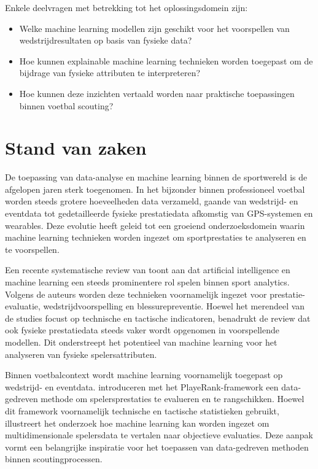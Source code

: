 Enkele deelvragen met betrekking tot het oplossingsdomein zijn: 
\begin{itemize}
    \item Welke machine learning modellen zijn geschikt voor het voorspellen van wedstrijdresultaten op basis van fysieke data?
    \item Hoe kunnen explainable machine learning technieken worden toegepast om de bijdrage van fysieke attributen te interpreteren?
    \item Hoe kunnen deze inzichten vertaald worden naar praktische toepassingen binnen voetbal scouting?
\end{itemize}


\section{Stand van zaken}%
\label{sec:literatuurstudie}

De toepassing van data-analyse en machine learning binnen de sportwereld is de afgelopen jaren sterk toegenomen. In het bijzonder binnen professioneel voetbal worden steeds grotere hoeveelheden data verzameld, gaande van wedstrijd- en eventdata tot gedetailleerde fysieke prestatiedata afkomstig van GPS-systemen en wearables. Deze evolutie heeft geleid tot een groeiend onderzoeksdomein waarin machine learning technieken worden ingezet om sportprestaties te analyseren en te voorspellen.

Een recente systematische review van \textcite{Pietraszewski2025_AI_SportsAnalytics} toont aan dat artificial intelligence en machine learning een steeds prominentere rol spelen binnen sport analytics. Volgens de auteurs worden deze technieken voornamelijk ingezet voor prestatie-evaluatie, wedstrijdvoorspelling en blessurepreventie. Hoewel het merendeel van de studies focust op technische en tactische indicatoren, benadrukt de review dat ook fysieke prestatiedata steeds vaker wordt opgenomen in voorspellende modellen. Dit onderstreept het potentieel van machine learning voor het analyseren van fysieke spelersattributen.

Binnen voetbalcontext wordt machine learning voornamelijk toegepast op wedstrijd- en eventdata. \textcite{Pappalardo2018_PlayeRank} introduceren met het PlayeRank-framework een data-gedreven methode om spelersprestaties te evalueren en te rangschikken. Hoewel dit framework voornamelijk technische en tactische statistieken gebruikt, illustreert het onderzoek hoe machine learning kan worden ingezet om multidimensionale spelersdata te vertalen naar objectieve evaluaties. Deze aanpak vormt een belangrijke inspiratie voor het toepassen van data-gedreven methoden binnen scoutingprocessen.

